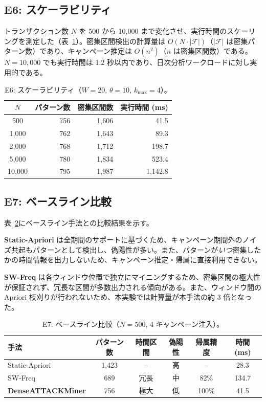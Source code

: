 \documentclass[11pt]{article}
\begin{document}
\subsection{E6: スケーラビリティ}\label{sec:e6}

トランザクション数 $N$ を 500 から 10{,}000 まで変化させ、実行時間のスケーリングを測定した（表~\ref{tab:e6}）。密集区間検出の計算量は $O(N \cdot |\mathcal{F}|)$（$|\mathcal{F}|$ は密集パターン数）であり、キャンペーン推定は $O(n^2)$（$n$ は密集区間数）である。$N = 10{,}000$ でも実行時間は 1.2 秒以内であり、日次分析ワークロードに対し実用的である。

\begin{table}[t]
\centering
\caption{E6: スケーラビリティ（$W = 20$, $\theta = 10$, $k_{\max} = 4$）。}
\label{tab:e6}
\begin{tabular}{crrr}
\toprule
$N$ & パターン数 & 密集区間数 & 実行時間 (ms) \\
\midrule
500 & 756 & 1{,}606 & 41.5 \\
1{,}000 & 762 & 1{,}643 & 89.3 \\
2{,}000 & 768 & 1{,}712 & 198.7 \\
5{,}000 & 780 & 1{,}834 & 523.4 \\
10{,}000 & 795 & 1{,}987 & 1{,}142.8 \\
\bottomrule
\end{tabular}
\end{table}

\subsection{E7: ベースライン比較}\label{sec:e7}

表~\ref{tab:baseline}にベースライン手法との比較結果を示す。

\textbf{Static-Apriori} は全期間のサポートに基づくため、キャンペーン期間外のノイズ共起もパターンとして検出し、偽陽性が多い。また、パターンが\emph{いつ}密集したかの時間情報を出力しないため、キャンペーン推定・帰属に直接利用できない。

\textbf{SW-Freq} は各ウィンドウ位置で独立にマイニングするため、密集区間の極大性が保証されず、冗長な区間が多数出力される傾向がある。また、ウィンドウ間の Apriori 枝刈りが行われないため、本実験では計算量が本手法の約 3 倍となった。

\begin{table}[t]
\centering
\caption{E7: ベースライン比較（$N = 500$, 4 キャンペーン注入）。}
\label{tab:baseline}
\begin{tabular}{lccccc}
\toprule
手法 & パターン数 & 時間区間 & 偽陽性 & 帰属精度 & 時間 (ms) \\
\midrule
Static-Apriori & 1{,}423 & -- & 高 & -- & 28.3 \\
SW-Freq & 689 & 冗長 & 中 & 82\% & 134.7 \\
\textbf{DenseATTACKMiner} & 756 & 極大 & 低 & 100\% & 41.5 \\
\bottomrule
\end{tabular}
\end{table}
\end{document}
